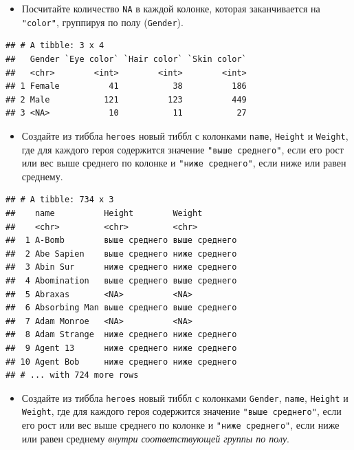 \documentclass[]{book}
\providecommand{\tightlist}{%
  \setlength{\itemsep}{0pt}\setlength{\parskip}{0pt}}
\begin{document}
\begin{itemize}
\tightlist
\item
  Посчитайте количество \texttt{NA} в каждой колонке, которая
  заканчивается на \texttt{"color"}, группируя по полу
  (\texttt{Gender}).
\end{itemize}

\begin{verbatim}
## # A tibble: 3 x 4
##   Gender `Eye color` `Hair color` `Skin color`
##   <chr>        <int>        <int>        <int>
## 1 Female          41           38          186
## 2 Male           121          123          449
## 3 <NA>            10           11           27
\end{verbatim}

\begin{itemize}
\tightlist
\item
  Создайте из тиббла \texttt{heroes} новый тиббл с колонками
  \texttt{name}, \texttt{Height} и \texttt{Weight}, где для каждого
  героя содержится значение \texttt{"выше\ среднего"}, если его рост или
  вес выше среднего по колонке и \texttt{"ниже\ среднего"}, если ниже
  или равен среднему.
\end{itemize}

\begin{verbatim}
## # A tibble: 734 x 3
##    name          Height        Weight       
##    <chr>         <chr>         <chr>        
##  1 A-Bomb        выше среднего выше среднего
##  2 Abe Sapien    выше среднего ниже среднего
##  3 Abin Sur      ниже среднего ниже среднего
##  4 Abomination   выше среднего выше среднего
##  5 Abraxas       <NA>          <NA>         
##  6 Absorbing Man выше среднего выше среднего
##  7 Adam Monroe   <NA>          <NA>         
##  8 Adam Strange  ниже среднего ниже среднего
##  9 Agent 13      ниже среднего ниже среднего
## 10 Agent Bob     ниже среднего ниже среднего
## # ... with 724 more rows
\end{verbatim}

\begin{itemize}
\tightlist
\item
  Создайте из тиббла \texttt{heroes} новый тиббл с колонками
  \texttt{Gender}, \texttt{name}, \texttt{Height} и \texttt{Weight}, где
  для каждого героя содержится значение \texttt{"выше\ среднего"}, если
  его рост или вес выше среднего по колонке и \texttt{"ниже\ среднего"},
  если ниже или равен среднему \emph{внутри соответствующей группы по
  полу}.
\end{itemize}
\end{document}

